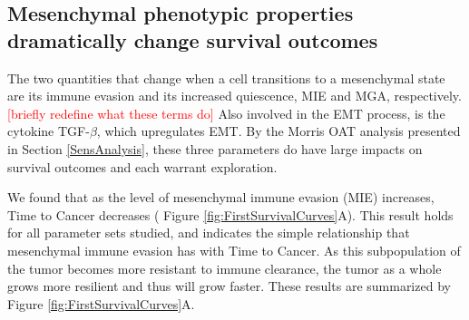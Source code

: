 \documentclass[11pt, a4paper, preprint]{article}
\newcommand{\tcr} { \textcolor{red} }
\begin{document}
\subsection{Mesenchymal phenotypic properties dramatically change survival outcomes}\label{MesPars}
The two quantities that change when a cell transitions to a mesenchymal state are its immune evasion and its increased quiescence, MIE and MGA, respectively. \tcr{[briefly redefine what these terms do]}
Also involved in the EMT process, is the cytokine TGF-$\beta$, which upregulates EMT.
By the Morris OAT analysis presented in Section \ref{SensAnalysis}, these three parameters do have large impacts on survival outcomes and each warrant exploration.


We found that as the level of mesenchymal immune evasion (MIE) increases, Time to Cancer decreases ( Figure \ref{fig:FirstSurvivalCurves}A).
This result holds for all parameter sets studied, and indicates the simple relationship that mesenchymal immune evasion has with Time to Cancer.
As this subpopulation of the tumor becomes more resistant to immune clearance, the tumor as a whole grows more resilient and thus will grow faster.
These results are summarized by Figure \ref{fig:FirstSurvivalCurves}A.
\end{document}
